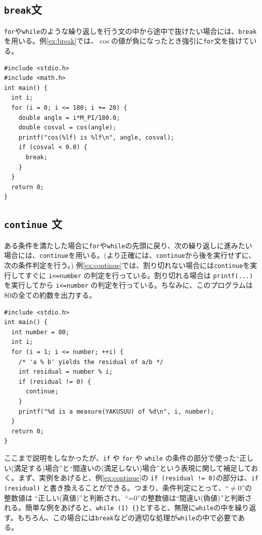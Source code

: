 \subsection{{\tt break}文}
{\tt for}や{\tt while}のような繰り返しを行う文の中から途中で抜けたい場合には、\verb|break|を用いる。例\ref{ex:break}では、$\cos$の値が負になったとき強引に\verb|for|文を抜けている。
\begin{reidai}\label{ex:break}
\begin{verbatim}
#include <stdio.h>
#include <math.h>
int main() {
  int i;
  for (i = 0; i <= 180; i += 20) {
    double angle = i*M_PI/180.0;
    double cosval = cos(angle);
    printf("cos(%lf) is %lf\n", angle, cosval);
    if (cosval < 0.0) {
      break;
    }
  }
  return 0;
}
\end{verbatim}
\end{reidai}

\subsection{{\tt continue} 文}
ある条件を満たした場合に\verb|for|や\verb|while|の先頭に戻り、次の繰り返しに進みたい場合には、\verb|continue|を用いる。(より正確には、\verb|continue|から後を実行せずに、次の条件判定を行う。) 例\ref{ex:continue}では、割り切れない場合には\verb|continue|を実行してすぐに \verb|i<=number| の判定を行っている。割り切れる場合は \verb|printf(...)| を実行してから \verb|i<=number| の判定を行っている。ちなみに、このプログラムは80の全ての約数を出力する。
\begin{reidai}\label{ex:continue}
\begin{verbatim}
#include <stdio.h>
int main() {
  int number = 80;
  int i;
  for (i = 1; i <= number; ++i) {
    /* 'a % b' yields the residual of a/b */
    int residual = number % i;
    if (residual != 0) {
      continue;
    }
    printf("%d is a measure(YAKUSUU) of %d\n", i, number);
  }
  return 0;
}
\end{verbatim}
\end{reidai}

ここまで説明をしなかったが、\verb|if| や \verb|for| や \verb|while| の条件の部分で使った``正しい(満足する)場合''と``間違いの(満足しない)場合''という表現に関して補足しておく。まず、実例をあげると、例\ref{ex:continue}の \verb|if (residual != 0)|の部分は、\verb|if (residual)| と書き換えることができる。つまり、条件判定にとって、``$\neq$0''の整数値は ``正しい(真値)''と判断され、``=0''の整数値は``間違い(偽値)''と判断される。簡単な例をあげると、\verb|while (1) {}|とすると、無限に\verb|while|の中を繰り返す。もちろん、この場合には{\tt break}などの適切な処理が\verb|while|の中で必要である。

